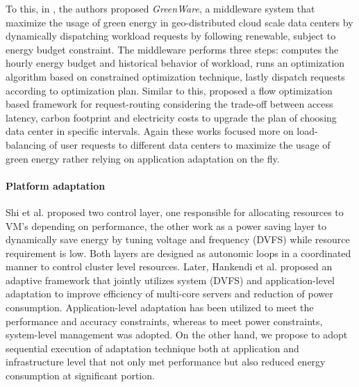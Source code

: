 To this, in \cite{GreenWare}, the authors proposed \emph{GreenWare}, a middleware system that maximize the usage of green energy in geo-distributed cloud scale data centers by dynamically dispatching workload requests by following renewable, subject to energy budget constraint. The middleware performs three steps: computes the hourly energy budget and historical behavior of workload, runs an optimization algorithm based on constrained optimization technique, lastly dispatch requests according to optimization plan. Similar to this, \cite{not-easy} proposed a flow optimization based framework for request-routing considering the trade-off between access latency, carbon footprint and electricity costs to upgrade the plan of choosing data center in specific intervals. Again these works focused more on load-balancing of user requests to different data centers to maximize the usage of green energy rather relying on application adaptation on the fly.



\paragraph*{\textbf{Platform adaptation}}

Shi et al. \cite{shi} proposed two control layer, one responsible for allocating resources to VM's depending on performance, the other work as a power saving layer to dynamically save energy by tuning voltage and frequency (DVFS) while resource requirement is low. Both layers are designed as autonomic loops in a coordinated
manner to control cluster level resources. Later, Hankendi et al. \cite{adaptcap} proposed an adaptive framework that jointly utilizes system (DVFS) and application-level
adaptation to improve efficiency of multi-core servers and reduction of power consumption. Application-level adaptation has been utilized to meet the performance
and accuracy constraints, whereas to meet power constraints, system-level
management was adopted. On the other hand, we propose to adopt sequential execution  of adaptation technique both at application and infrastructure level that not only met performance but also reduced energy consumption at significant portion. 


